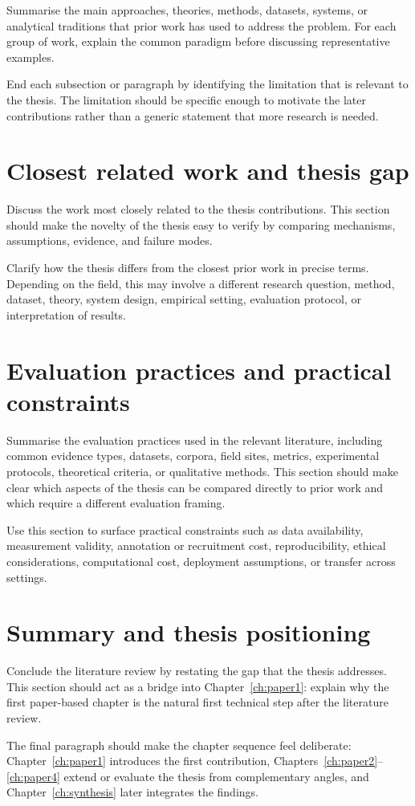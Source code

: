 Summarise the main approaches, theories, methods, datasets, systems, or analytical traditions that prior work has used to address the problem. For each group of work, explain the common paradigm before discussing representative examples.

End each subsection or paragraph by identifying the limitation that is relevant to the thesis. The limitation should be specific enough to motivate the later contributions rather than a generic statement that more research is needed.

\section{Closest related work and thesis gap}

Discuss the work most closely related to the thesis contributions. This section should make the novelty of the thesis easy to verify by comparing mechanisms, assumptions, evidence, and failure modes.

Clarify how the thesis differs from the closest prior work in precise terms. Depending on the field, this may involve a different research question, method, dataset, theory, system design, empirical setting, evaluation protocol, or interpretation of results.

\section{Evaluation practices and practical constraints}

Summarise the evaluation practices used in the relevant literature, including common evidence types, datasets, corpora, field sites, metrics, experimental protocols, theoretical criteria, or qualitative methods. This section should make clear which aspects of the thesis can be compared directly to prior work and which require a different evaluation framing.

Use this section to surface practical constraints such as data availability, measurement validity, annotation or recruitment cost, reproducibility, ethical considerations, computational cost, deployment assumptions, or transfer across settings.

\section{Summary and thesis positioning}

Conclude the literature review by restating the gap that the thesis addresses. This section should act as a bridge into Chapter~\ref{ch:paper1}: explain why the first paper-based chapter is the natural first technical step after the literature review.

The final paragraph should make the chapter sequence feel deliberate: Chapter~\ref{ch:paper1} introduces the first contribution, Chapters~\ref{ch:paper2}--\ref{ch:paper4} extend or evaluate the thesis from complementary angles, and Chapter~\ref{ch:synthesis} later integrates the findings.
